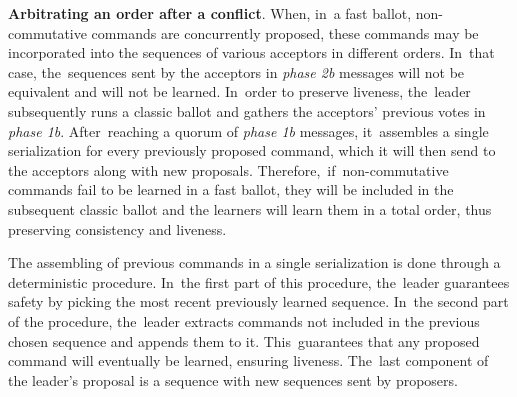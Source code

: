 \documentclass[algorithms,article,accept,moreauthors,pdftex,10pt,a4paper]{Definitions/mdpi}
\begin{document}
\textbf{Arbitrating an order after a conflict}. When, in~a fast ballot, non-commutative commands are concurrently proposed, these commands may be incorporated into the sequences of various acceptors in different orders. In~that case, the~sequences sent by the acceptors in \textit{phase 2b} messages will not be equivalent and will not be learned. In~order to preserve liveness, the~leader subsequently runs a classic ballot and gathers the acceptors' previous votes in \textit{phase 1b}. After~reaching a quorum of \textit{phase 1b} messages, it~assembles a single serialization for every previously proposed command, which it will then send to the acceptors along with new proposals. Therefore,~if~non-commutative commands fail to be learned in a fast ballot, they will be included in the subsequent classic ballot and the learners will learn them in a total order, thus preserving consistency and liveness. \par 
The assembling of previous commands in a single serialization is done through a deterministic procedure. In~the first part of this procedure, the~leader guarantees safety by picking the most recent previously learned sequence. In~the second part of the procedure, the~leader extracts commands not included in the previous chosen sequence and appends them to it. This~guarantees that any proposed command will eventually be learned, ensuring liveness. The~last component of the leader's proposal is a sequence with new sequences sent by proposers. 
\end{document}

